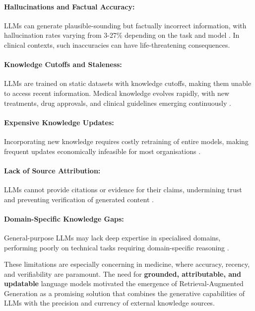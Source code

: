 \paragraph{Hallucinations and Factual Accuracy:} LLMs can generate plausible-sounding but factually incorrect information, with hallucination rates varying from 3-27\% depending on the task and model \citep{zhang2023sirens}. In clinical contexts, such inaccuracies can have life-threatening consequences.

\paragraph{Knowledge Cutoffs and Staleness:} LLMs are trained on static datasets with knowledge cutoffs, making them unable to access recent information. Medical knowledge evolves rapidly, with new treatments, drug approvals, and clinical guidelines emerging continuously \citep{rogers2023prompt}.

\paragraph{Expensive Knowledge Updates:} Incorporating new knowledge requires costly retraining of entire models, making frequent updates economically infeasible for most organisations \citep{zhu2020modifying}.

\paragraph{Lack of Source Attribution:} LLMs cannot provide citations or evidence for their claims, undermining trust and preventing verification of generated content \citep{rashkin2021measuring}.

\paragraph{Domain-Specific Knowledge Gaps:} General-purpose LLMs may lack deep expertise in specialised domains, performing poorly on technical tasks requiring domain-specific reasoning \citep{hendrycks2021measuring}.

These limitations are especially concerning in medicine, where accuracy, recency, and verifiability are paramount. The need for \textbf{grounded, attributable, and updatable} language models motivated the emergence of Retrieval-Augmented Generation as a promising solution that combines the generative capabilities of LLMs with the precision and currency of external knowledge sources.

